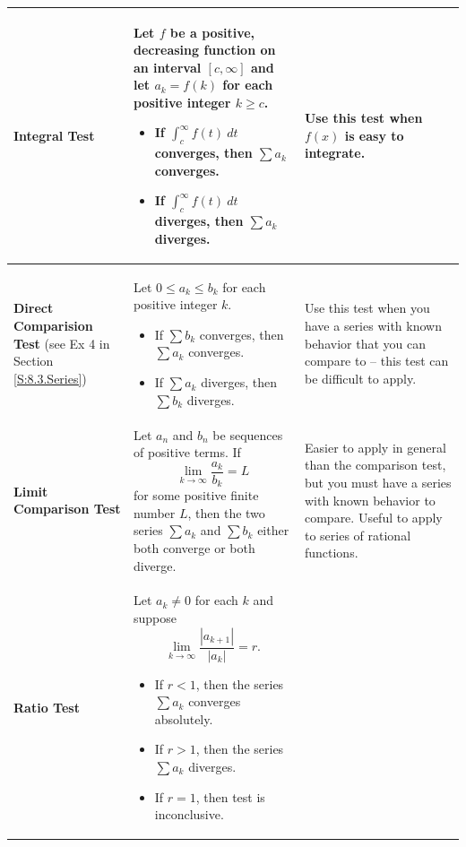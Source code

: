 \begingroup
\footnotesize
\begin{center}
\begin{tabular}{p{0.75in}|p{2.5in}|p{1.5in}} \hline
 \vphantom{\Large{M}} \textbf{Integral Test}  & %
Let $f$ be a positive, decreasing function on an interval $[c,\infty]$ and let $a_k = f(k)$ for each positive integer $k \geq c$.
	\begin{itemize}
	\item If $\int_c^{\infty} f(t) \ dt$ converges, then $\sum a_k$ converges.
	\item If $ \int_c^{\infty} f(t) \ dt$ diverges, then $\sum a_k$ diverges.
	\end{itemize}
&Use this test when $f(x)$ is easy to integrate. \\ \hline
 \vphantom{\Large{M}} \textbf{Direct Comparision Test} (see Ex 4 in Section \ref{S:8.3.Series})  &Let $0 \leq a_k \leq b_k$ for each positive integer $k$.
	\begin{itemize}
	\item If $\sum b_k$ converges, then $\sum a_k$ converges.
	\item If $\sum a_k$ diverges, then $\sum b_k$ diverges.
	\end{itemize}
&Use this test when you have a series with known behavior that you can compare to -- this test can be difficult to apply. \\ \hline
 \vphantom{\Large{M}} \textbf{Limit Comparison Test}  &Let $a_n$ and $b_n$ be sequences of positive terms. If
\[\displaystyle \lim_{k \to \infty} \frac{a_k}{b_k} = L\]
for some positive finite number $L$, then the two series $\sum a_k$ and $\sum b_k$ either both converge or both diverge. &Easier to apply in general than the comparison test, but you must have a series with known behavior to compare. Useful to apply to series of rational functions. \\  \hline
 \vphantom{\Large{M}} \textbf{Ratio Test} & Let $a_k \neq 0$ for each $k$ and suppose
\[\displaystyle \lim_{k \to \infty} \frac{|a_{k+1}|}{|a_k|} = r.\]
	\begin{itemize}
	\item If $r < 1$, then the series $\sum a_k$ converges absolutely.
	\item If $r > 1$, then the series $\sum a_k$ diverges.
	\item If $r=1$, then test is inconclusive.
	\end{itemize}

\end{tabular}
\end{center}

